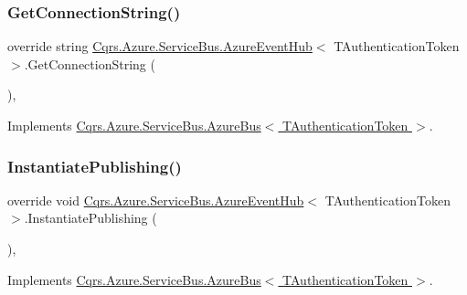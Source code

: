 \subsubsection{\texorpdfstring{Get\+Connection\+String()}{GetConnectionString()}}
{\footnotesize\ttfamily override string \hyperlink{classCqrs_1_1Azure_1_1ServiceBus_1_1AzureEventHub}{Cqrs.\+Azure.\+Service\+Bus.\+Azure\+Event\+Hub}$<$ T\+Authentication\+Token $>$.Get\+Connection\+String (\begin{DoxyParamCaption}{ }\end{DoxyParamCaption})\hspace{0.3cm}{\ttfamily [protected]}, {\ttfamily [virtual]}}



Implements \hyperlink{classCqrs_1_1Azure_1_1ServiceBus_1_1AzureBus_a514e371d5ce093678365af31e6c274e3}{Cqrs.\+Azure.\+Service\+Bus.\+Azure\+Bus$<$ T\+Authentication\+Token $>$}.

\mbox{\label{classCqrs_1_1Azure_1_1ServiceBus_1_1AzureEventHub_a3747fb9fcb3de2a72c8a6d7bbd92db95}} 
\subsubsection{\texorpdfstring{Instantiate\+Publishing()}{InstantiatePublishing()}}
{\footnotesize\ttfamily override void \hyperlink{classCqrs_1_1Azure_1_1ServiceBus_1_1AzureEventHub}{Cqrs.\+Azure.\+Service\+Bus.\+Azure\+Event\+Hub}$<$ T\+Authentication\+Token $>$.Instantiate\+Publishing (\begin{DoxyParamCaption}{ }\end{DoxyParamCaption})\hspace{0.3cm}{\ttfamily [protected]}, {\ttfamily [virtual]}}



Implements \hyperlink{classCqrs_1_1Azure_1_1ServiceBus_1_1AzureBus_a0bacaa4619921333da4a27371c1d6d0a}{Cqrs.\+Azure.\+Service\+Bus.\+Azure\+Bus$<$ T\+Authentication\+Token $>$}.

\mbox{\label{classCqrs_1_1Azure_1_1ServiceBus_1_1AzureEventHub_aa725781eddb65bdfe456a4fecb36fb6b}} 

